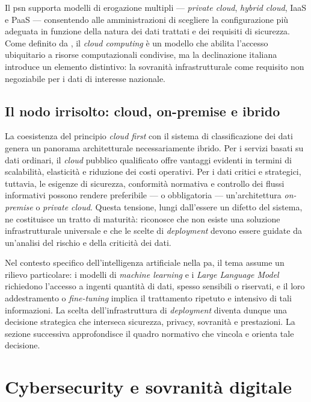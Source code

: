 Il \gls{psn} supporta modelli di erogazione multipli --- \textit{private cloud}, \textit{hybrid cloud}, IaaS e PaaS --- consentendo alle amministrazioni di scegliere la configurazione più adeguata in funzione della natura dei dati trattati e dei requisiti di sicurezza. Come definito da \textcite{NIST_SP800_145}, il \textit{cloud computing} è un modello che abilita l'accesso ubiquitario a risorse computazionali condivise, ma la declinazione italiana introduce un elemento distintivo: la sovranità infrastrutturale come requisito non negoziabile per i dati di interesse nazionale.

\subsection{Il nodo irrisolto: cloud, on-premise e ibrido}

La coesistenza del principio \textit{cloud first} con il sistema di classificazione dei dati genera un panorama architetturale necessariamente ibrido. Per i servizi basati su dati ordinari, il \textit{cloud} pubblico qualificato offre vantaggi evidenti in termini di scalabilità, elasticità e riduzione dei costi operativi. Per i dati critici e strategici, tuttavia, le esigenze di sicurezza, conformità normativa e controllo dei flussi informativi possono rendere preferibile --- o obbligatoria --- un'architettura \textit{on-premise} o \textit{private cloud}. Questa tensione, lungi dall'essere un difetto del sistema, ne costituisce un tratto di maturità: riconosce che non esiste una soluzione infrastrutturale universale e che le scelte di \textit{deployment} devono essere guidate da un'analisi del rischio e della criticità dei dati.

Nel contesto specifico dell'intelligenza artificiale nella \gls{pa}, il tema assume un rilievo particolare: i modelli di \textit{machine learning} e i \textit{Large Language Model} richiedono l'accesso a ingenti quantità di dati, spesso sensibili o riservati, e il loro addestramento o \textit{fine-tuning} implica il trattamento ripetuto e intensivo di tali informazioni. La scelta dell'infrastruttura di \textit{deployment} diventa dunque una decisione strategica che interseca sicurezza, privacy, sovranità e prestazioni. La sezione successiva approfondisce il quadro normativo che vincola e orienta tale decisione.


\section{Cybersecurity e sovranità digitale}
\label{sec:cybersecurity}

